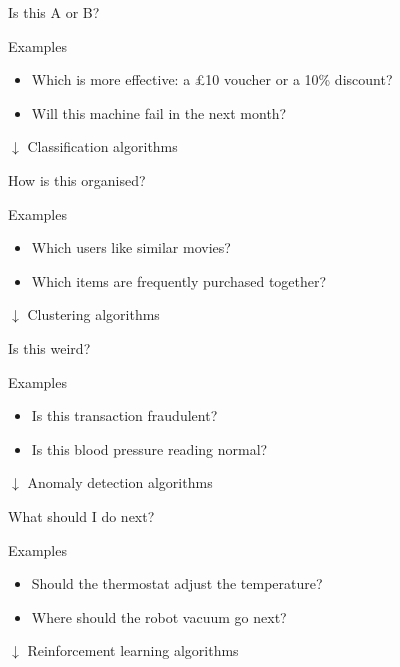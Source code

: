 \begin{frame}{Is this A or B?}
    \begin{block}{Examples}
        \begin{itemize}
            \item Which is more effective: a £10 voucher or a 10\% discount?
            \item Will this machine fail in the next month?
        \end{itemize}
    \end{block}
    \begin{center}
        \large%
        $\downarrow$
        \vfill
        \alert{Classification} algorithms
    \end{center}
\end{frame}

\begin{frame}{How is this organised?}
    \begin{block}{Examples}
        \begin{itemize}
            \item Which users like similar movies?
            \item Which items are frequently purchased together?
        \end{itemize}
    \end{block}
    \begin{center}
        \large%
        $\downarrow$
        \vfill
        \alert{Clustering} algorithms
    \end{center}
\end{frame}

\begin{frame}{Is this weird?}
    \begin{block}{Examples}
        \begin{itemize}
            \item Is this transaction fraudulent?
            \item Is this blood pressure reading normal?
        \end{itemize}
    \end{block}
    \begin{center}
        \large%
        $\downarrow$
        \vfill
        \alert{Anomaly detection} algorithms
    \end{center}
\end{frame}

\begin{frame}{What should I do next?}
    \begin{block}{Examples}
        \begin{itemize}
            \item Should the thermostat adjust the temperature?
            \item Where should the robot vacuum go next?
        \end{itemize}
    \end{block}
    \begin{center}
        \large%
        $\downarrow$
        \vfill
        \alert{Reinforcement learning} algorithms
    \end{center}
\end{frame}

